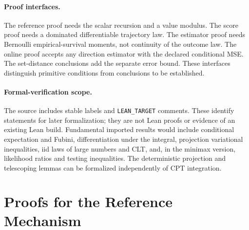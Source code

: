 \documentclass[11pt]{article}
\newcommand{\1}{\mathbf 1}
\theoremstyle{definition}
\begin{document}
\paragraph{Proof interfaces.}
The reference proof needs the scalar recursion and a value modulus. The score proof needs a dominated differentiable trajectory law. The estimator proof needs Bernoulli empirical-survival moments, not continuity of the outcome law. The online proof accepts any direction estimator with the declared conditional MSE. The set-distance conclusions add the separate error bound. These interfaces distinguish primitive conditions from conclusions to be established.

\paragraph{Formal-verification scope.}
The source includes stable labels and \texttt{LEAN\_TARGET} comments. These identify statements for later formalization; they are not Lean proofs or evidence of an existing Lean build. Fundamental imported results would include conditional expectation and Fubini, differentiation under the integral, projection variational inequalities, iid laws of large numbers and CLT, and, in the minimax version, likelihood ratios and testing inequalities. The deterministic projection and telescoping lemmas can be formalized independently of CPT integration.

\section{Proofs for the Reference Mechanism}\label{app:reference-proofs}
\end{document}
